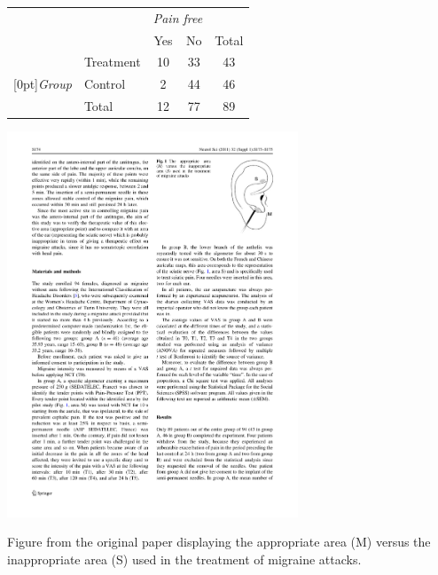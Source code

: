 {	\noindent\begin{minipage}[l]{0.4\textwidth}
		\begin{tabular}{ll  cc c} 
			&           & \multicolumn{2}{c}{\textit{Pain free}} \\
			\cline{3-4}
			&			& Yes 	& No 	                  & Total \\
			\cline{2-5}
			& Treatment 	& 10	 	& 33		                  & 43 \\
			\raisebox{1.5ex}[0pt]{\emph{Group}} & Control	 	& 2	 	& 44 	 	                  & 46 \\
			\cline{2-5}
			& Total		& 12		& 77		                  & 89
		\end{tabular}
	\end{minipage}
	\begin{minipage}[c]{0.05\textwidth}
	\end{minipage}
	\begin{minipage}[c]{0.27\textwidth}
		\begin{center}
			\includegraphics[width = 0.65\textwidth]{ch_intro_to_data_oi_biostat/figures/eoce/migraine_and_acupuncture_intro/earacupuncture.pdf}
		\end{center}
	\end{minipage}
	\begin{minipage}[c]{0.25\textwidth}
		{\footnotesize Figure from the original paper displaying the appropriate area 
			(M) versus the inappropriate area (S) used in the treatment of migraine attacks.}
	\end{minipage}
}
